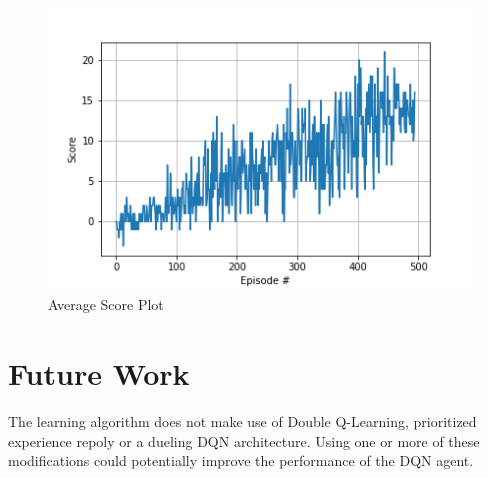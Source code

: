\documentclass{article}
\begin{document}
\begin{figure}[h!]
\label{fig:results}
\centering
\includegraphics[scale=0.75]{./figures/results.png}
\caption{Average Score Plot}
\end{figure}

\section{Future Work}
The learning algorithm does not make use of Double Q-Learning, prioritized experience repoly or a dueling DQN architecture. Using one or more of these modifications could potentially improve the performance of the DQN agent. 



\end{document}
